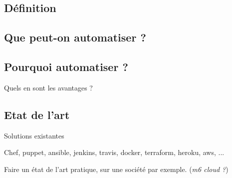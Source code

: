 
\subsection{Définition}

\subsection{Que peut-on automatiser ?}

\subsection{Pourquoi automatiser ?}

Quels en sont les avantages ?

\subsection{Etat de l'art}

Solutions existantes

Chef, puppet, ansible, jenkins, travis, docker, terraform, heroku, aws, ...

Faire un état de l'art pratique, sur une société par exemple. (\textit{m6 cloud ?})
